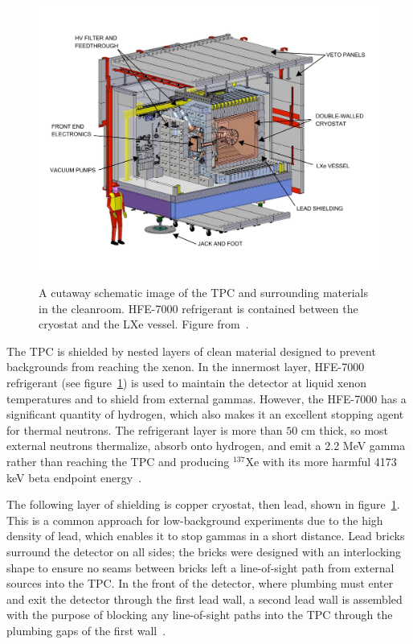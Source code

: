 \begin{figure}
\begin{center}
\includegraphics[keepaspectratio=true,width=\textwidth]{cleanroom.pdf}
\end{center}
\renewcommand{\baselinestretch}{1}
\small\normalsize
\begin{quote}
\caption{A cutaway schematic image of the TPC and surrounding materials in the cleanroom.  HFE-7000 refrigerant is contained between the cryostat and the LXe vessel.  Figure from~\cite{detectorPartI}.}
\label{fig:CleanRoomCutaway}
\end{quote}
\end{figure}
\renewcommand{\baselinestretch}{2}
\small\normalsize

The TPC is shielded by nested layers of clean material designed to prevent backgrounds from reaching the xenon.  In the innermost layer, HFE-7000 refrigerant (see figure~\ref{fig:CleanRoomCutaway}) is used to maintain the detector at liquid xenon temperatures and to shield from external gammas.  However, the HFE-7000 has a significant quantity of hydrogen, which also makes it an excellent stopping agent for thermal neutrons.  The refrigerant layer is more than $50$ cm thick, so most external neutrons thermalize, absorb onto hydrogen, and emit a 2.2 MeV gamma rather than reaching the TPC and producing $^{137}$Xe with its more harmful 4173 keV beta endpoint energy~\cite{detectorPartI}.

The following layer of shielding is copper cryostat, then lead, shown in figure~\ref{fig:CleanRoomCutaway}.  This is a common approach for low-background experiments due to the high density of lead, which enables it to stop gammas in a short distance.  Lead bricks surround the detector on all sides; the bricks were designed with an interlocking shape to ensure no seams between bricks left a line-of-sight path from external sources into the TPC.  In the front of the detector, where plumbing must enter and exit the detector through the first lead wall, a second lead wall is assembled with the purpose of blocking any line-of-sight paths into the TPC through the plumbing gaps of the first wall~\cite{detectorPartI}.

